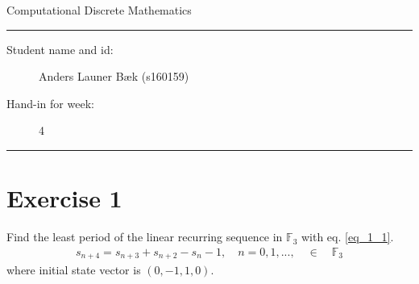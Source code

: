 \documentclass[11pt]{article}
\begin{document}
\begin{center}
{{\Large \sc Computational Discrete Mathematics}}
\end{center}
\rule{\textwidth}{1pt}
\begin{description}
\item[Student name and id:] Anders Launer Bæk (s160159)
\item[Hand-in for week:] 4
\end{description}
\rule{\textwidth}{1pt}


\section*{Exercise 1}

Find the least period of the linear recurring sequence in $\mathbb{F}_{3}$ with eq. \ref{eq_1_1}.
\begin{equation}
\begin{align}
s_{n+4} = s_{n+3} + s_{n+2} - s_{n} -1, \quad n =0,1,..., \quad \in \quad  \mathbb{F}_{3}
\end{align}
\label{eq_1_1}
\end{equation}
where initial state vector is  $(0,-1,1,0)$.



\end{document}

